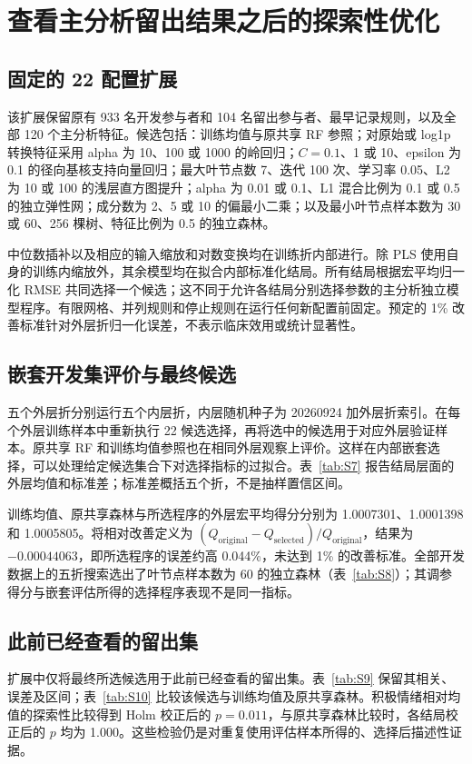 

\section{查看主分析留出结果之后的探索性优化}
\subsection{固定的 22 配置扩展}
该扩展保留原有 933 名开发参与者和 104 名留出参与者、最早记录规则，以及全部 120 个主分析特征。候选包括：训练均值与原共享 RF 参照；对原始或 log1p 转换特征采用 alpha 为 10、100 或 1000 的岭回归；$C=0.1$、1 或 10、epsilon 为 0.1 的径向基核支持向量回归；最大叶节点数 7、迭代 100 次、学习率 0.05、L2 为 10 或 100 的浅层直方图提升；alpha 为 0.01 或 0.1、L1 混合比例为 0.1 或 0.5 的独立弹性网；成分数为 2、5 或 10 的偏最小二乘；以及最小叶节点样本数为 30 或 60、256 棵树、特征比例为 0.5 的独立森林。

中位数插补以及相应的输入缩放和对数变换均在训练折内部进行。除 PLS 使用自身的训练内缩放外，其余模型均在拟合内部标准化结局。所有结局根据宏平均归一化 RMSE 共同选择一个候选；这不同于允许各结局分别选择参数的主分析独立模型程序。有限网格、并列规则和停止规则在运行任何新配置前固定。预定的 1\% 改善标准针对外层折归一化误差，不表示临床效用或统计显著性。

\subsection{嵌套开发集评价与最终候选}
五个外层折分别运行五个内层折，内层随机种子为 20260924 加外层折索引。在每个外层训练样本中重新执行 22 候选选择，再将选中的候选用于对应外层验证样本。原共享 RF 和训练均值参照也在相同外层观察上评价。这样在内部嵌套选择，可以处理给定候选集合下对选择指标的过拟合\citep{cawley2010}。表~\ref{tab:S7} 报告结局层面的外层均值和标准差；标准差概括五个折，不是抽样置信区间。



训练均值、原共享森林与所选程序的外层宏平均得分分别为 1.0007301、1.0001398 和 1.0005805。将相对改善定义为 $(Q_{\mathrm{original}}-Q_{\mathrm{selected}})/Q_{\mathrm{original}}$，结果为 $-0.00044063$，即所选程序的误差约高 0.044\%，未达到 1\% 的改善标准。全部开发数据上的五折搜索选出了叶节点样本数为 60 的独立森林（表~\ref{tab:S8}）；其调参得分与嵌套评估所得的选择程序表现不是同一指标。



\subsection{此前已经查看的留出集}
扩展中仅将最终所选候选用于此前已经查看的留出集。表~\ref{tab:S9} 保留其相关、误差及区间；表~\ref{tab:S10} 比较该候选与训练均值及原共享森林。积极情绪相对均值的探索性比较得到 Holm 校正后的 $p=0.011$，与原共享森林比较时，各结局校正后的 $p$ 均为 1.000。这些检验仍是对重复使用评估样本所得的、选择后描述性证据。


